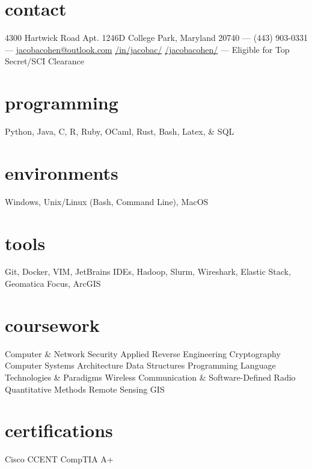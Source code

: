 \documentclass[print]{friggeri-cv} %
\begin{document}


\begin{aside} %
\section{contact}
4300 Hartwick Road 
Apt. 1246D
College Park, Maryland
20740
---
(443) 903-0331
---
\href{mailto:jacobacohen@outlook.com}{jacobacohen@outlook.com}
\href{linkedin.com/in/jacobac/ }{\faLinkedinSquare /in/jacobac/}
\href{github.com/jacobacohen}{\faGithub /jacobacohen/}
---
Eligible for Top Secret/SCI Clearance
\section{programming}
Python, Java, C, R, Ruby, OCaml, Rust, Bash, Latex, \& SQL
\section{environments}
Windows, Unix/Linux (Bash, Command Line), MacOS

\section{tools}
Git, Docker, VIM, JetBrains IDEs, Hadoop, Slurm, Wireshark, Elastic Stack, Geomatica Focus, ArcGIS

\section{coursework}

Computer \& Network \hspace*{.2cm} Security
Applied Reverse Engineering
Cryptography
Computer Systems Architecture
Data Structures
Programming Language \hspace*{.2cm} Technologies \& Paradigms
Wireless Communication \& \hspace*{.2cm} Software-Defined Radio
Quantitative Methods
Remote Sensing
GIS
\section{certifications}
Cisco CCENT
CompTIA A+

\end{aside}
\end{document}
